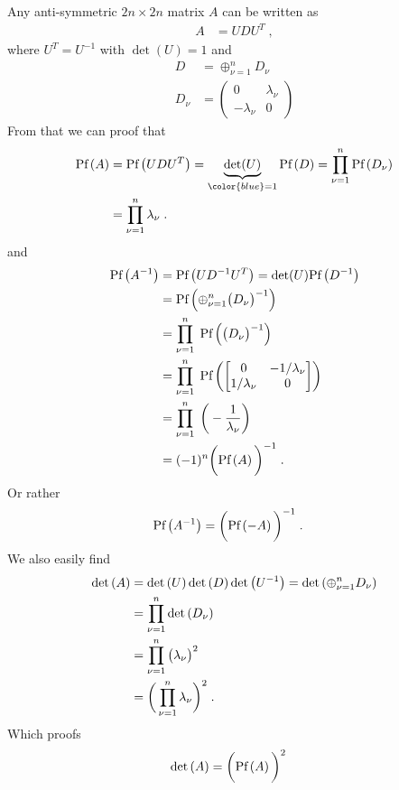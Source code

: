 Any anti-symmetric $2n\times 2n$ matrix $A$ can be written as
%
\begin{align*}
A &= U D U^{T}\;,
\end{align*}
%
where $U^{T}=U^{-1}$ with $\det(U) = 1$  and
%
\begin{align*}
D &= \oplus_{\nu=1}^{n} D_{\nu}\\
D_{\nu} &= \begin{pmatrix}
	0 &\lambda_{\nu}\\
	-\lambda_{\nu}&0
\end{pmatrix}
\end{align*}
%
From that we can proof that
%
\begin{align*}
\Pf{A} &=  \Pf{U D U^{T}} = \underbrace{
\det(U)
}_{\color{blue} = 1} \Pf{D}
=\prod_{\nu=1}^{n} \Pf{D_{\nu}} \\
&=\prod_{\nu=1}^{n} \lambda_{\nu}\;.
\end{align*}
%
and
%
\begin{align*}
\text{Pf}\left(A^{-1}\right) &= \text{Pf}\left(U D^{-1} U^{T}\right) = \det(U) \text{Pf}\left(D^{-1}\right)\\
&=\text{Pf}\left(\oplus_{\nu=1}^{n} \big(D_{\nu}\big)^{-1}\right)\\
&=\prod_{\nu=1}^{n}\;\text{Pf}\left(\big(D_{\nu}\big)^{-1}\right)\\
&=\prod_{\nu=1}^{n}\;
\text{Pf}\left(
\begin{bmatrix}
	0 & -1/\lambda_{\nu}\\
	1/\lambda_{\nu}&0
\end{bmatrix}
\right)\\
&=\prod_{\nu=1}^{n}\; \bigg(-\frac{1}{\lambda_{\nu}}\bigg)\\
&= (-1)^{n} \bigg(\text{Pf}\left(A\right)\bigg)^{-1}\;.
\end{align*}
%
Or rather
%
\begin{align}\label{eq:pfaf:inv}
\text{Pf}\left(A^{-1}\right) &= \bigg(\text{Pf}\left(-A\right) \bigg)^{-1}\;.
\end{align}
%
We also easily find
%
\begin{align*}
\text{det}\left(A\right) &= \text{det}\left(U\right)\text{det}\left(D\right)\text{det}\left(U^{-1}\right) = \text{det}\left(\oplus_{\nu=1}^{n} D_{\nu}\right)\\
&=\prod_{\nu=1}^{n} \text{det}\left(D_{\nu}\right)	\\
&=\prod_{\nu=1}^{n} \big(\lambda_{\nu}\big)^{2}	\\
&=\bigg( \prod_{\nu=1}^{n} \lambda_{\nu}\bigg)^{2}	\;.
\end{align*}
%
Which proofs
%
\begin{align}\label{eq:}
\text{det}\left(A\right) &= \bigg(\text{Pf}\left(A\right)\bigg)^{2}
\end{align}
%

